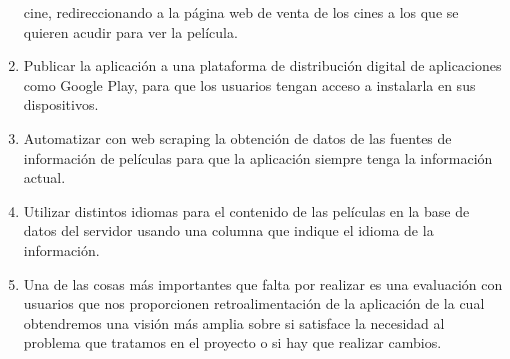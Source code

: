 \begin{enumerate}
     cine, redireccionando a la página web de venta de los cines a los que se
     quieren acudir para ver la película.
    \item Publicar la aplicación a una plataforma de distribución digital de
    aplicaciones como Google Play, para que los usuarios tengan acceso a
    instalarla en sus dispositivos.
    \item Automatizar con web scraping la obtención de datos de las fuentes de
     información de películas para que la aplicación siempre tenga la
     información actual.
    \item Utilizar distintos idiomas para el contenido de las películas en la
     base de datos del servidor usando una columna que indique el idioma de la
     información.
    \item Una de las cosas más importantes que falta por realizar es una
     evaluación con usuarios que nos proporcionen retroalimentación de la
     aplicación de la cual obtendremos una visión más amplia sobre si satisface
     la necesidad al problema que tratamos en el proyecto o si hay que realizar
     cambios. 
\end{enumerate}